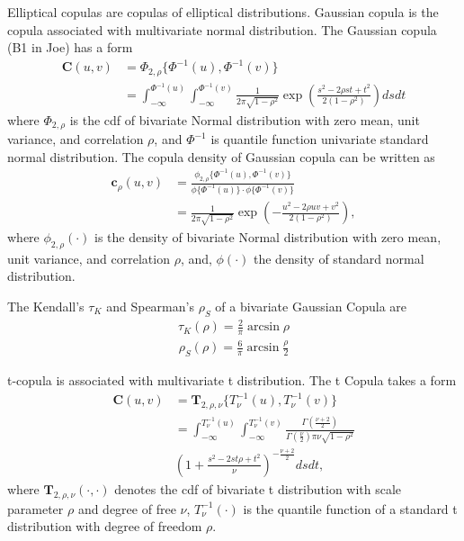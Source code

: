 Elliptical copulas are copulas of elliptical distributions.
Gaussian copula is the copula associated with multivariate normal distribution.
The Gaussian copula (B1 in Joe) has a form
    \begin{align}
        \bm{C}(u,v) &= \Phi_{2, \rho}\{\Phi^{-1}(u), \Phi^{-1}(v)\} \\
                    &= \int_{-\infty}^{\Phi^{-1}(u)}
                       \int_{-\infty}^{\Phi^{-1}(v)}
                       \frac{1}{2\pi\sqrt{1-\rho^2}}
                       \exp{\left(
                       \frac{s^2-2\rho st+t^2}{2(1-\rho^2)}
                       \right)} ds dt
        \end{align}
where $\Phi_{2, \rho}$ is the cdf of bivariate Normal distribution with zero mean, unit variance, and correlation $\rho$,
and $\Phi^{-1}$ is quantile function univariate standard normal distribution.
The copula density of Gaussian copula can be written as
\begin{align}
    \bm{c}_\rho(u,v) &= \frac{\phi_{2,\rho}\{\Phi^{-1}(u), \Phi^{-1}(v)\}}
                        {\phi\{\Phi^{-1}(u)\} \cdot \phi\{\Phi^{-1}(v)\}}\\
                &= \frac{1}{2\pi\sqrt{1-\rho^2}}\exp\left(
                   -\frac{u^2 - 2\rho uv + v^2}{2(1-\rho^2)}
                   \right) ,
    \end{align}
where $\phi_{2,\rho}(\cdot)$ is the density of bivariate Normal distribution with zero mean,
unit variance,
and correlation $\rho$,
and, $\phi(\cdot)$ the density of standard normal distribution.\medskip

The Kendall's $\tau_K$ and Spearman's $\rho_S$ of a bivariate Gaussian Copula are
    \begin{align}
        \tau_K(\rho) = \frac{2}{\pi}\arcsin\rho
        \end{align}
    \begin{align}
        \rho_S(\rho) = \frac{6}{\pi}\arcsin\frac{\rho}{2}
        \end{align}\medskip

t-copula is associated with multivariate t distribution.
The t Copula takes a form
\begin{align}
        \bm{C}(u,v) &= \bm{T}_{2, \rho, \nu}\{T^{-1}_\nu(u), T^{-1}_\nu(v)\} \\
            &= \int_{-\infty}^{T^{-1}_\nu(u)}
               \int_{-\infty}^{T^{-1}_\nu(v)}
            \frac{\Gamma\left(\frac{\nu+2}{2}\right)}
            {\Gamma\left(\frac{\nu}{2}\right)\pi\nu\sqrt{1-\rho^2}}\\
           & \left(
        1+\frac{s^2-2st\rho+t^2}{\nu}
        \right)^{-\frac{\nu+2}{2}} ds dt,
    \end{align}
where $\bm{T}_{2, \rho, \nu}(\cdot, \cdot)$ denotes the cdf of bivariate t distribution with scale parameter $\rho$ and degree of free $\nu$,
$T^{-1}_\nu(\cdot)$ is the quantile function of a standard t distribution with degree of freedom $\rho$.

